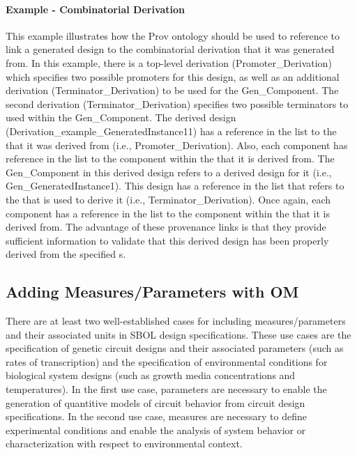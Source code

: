 \clearpage

\paragraph{Example - Combinatorial Derivation}
This example illustrates how the Prov ontology should be used to reference to link a generated design to the combinatorial derivation that it was generated from.  In this example, there is a top-level derivation (Promoter\_Derivation) which specifies two possible promoters for this design, as well as an additional derivation (Terminator\_Derivation) to be used for the Gen\_Component.  The second derivation (Terminator\_Derivation) specifies two possible terminators to used within the Gen\_Component.  The derived design (Derivation\_example\_GeneratedInstance11) has a reference in the  list to the  that it was derived from (i.e., Promoter\_Derivation).  Also, each component has reference in the  list to the component within the  that it is derived from.  The Gen\_Component in this derived design refers to a derived design for it (i.e., Gen\_GeneratedInstance1).  This design has a reference in the  list that refers to the  that is used to derive it (i.e., Terminator\_Derivation).  Once again, each component has a reference in the  list to the component within the  that it is derived from.  The advantage of these provenance links is that they provide sufficient information to validate that this derived design has been properly derived from the specified s.

\subsection{Adding Measures/Parameters with OM}
\label{sec:parameters}

There are at least two well-established cases for including measures/parameters and their associated units in SBOL design specifications. These use cases are the specification of genetic circuit designs and their associated parameters (such as rates of transcription) and the specification of environmental conditions for biological system designs (such as growth media concentrations and temperatures). In the first use case, parameters are necessary to enable the generation of quantitive models of circuit behavior from circuit design specifications. In the second use case, measures are necessary to define experimental conditions and enable the analysis of system behavior or characterization with respect to environmental context.

